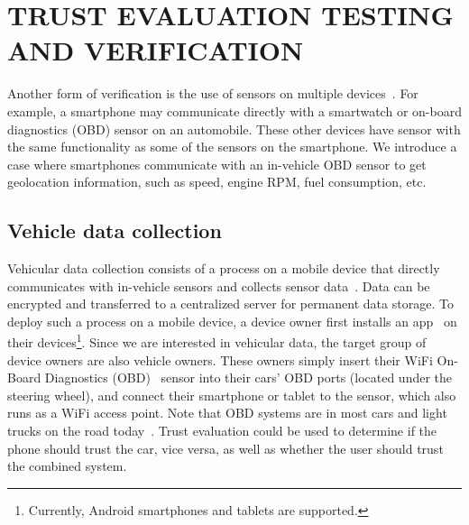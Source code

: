 \section{TRUST EVALUATION TESTING AND VERIFICATION}
\label{sec:geolocation}
Another form of verification is the use of sensors on multiple devices~\cite{ju2012neteye}.  For example,
a smartphone may communicate directly with a smartwatch or on-board diagnostics (OBD)
sensor on an automobile.  These other devices have sensor with the same
functionality as some of the sensors on the smartphone.
We introduce a case where smartphones communicate with an in-vehicle OBD sensor
to get geolocation information, such as speed, engine RPM, fuel consumption, 
etc.

\subsection{Vehicle data collection}

Vehicular data collection consists of a process on a mobile 
device that directly communicates with in-vehicle sensors and collects sensor 
data~\cite{sensor}. Data can be encrypted and transferred to a
centralized server for permanent data storage. 
To deploy such a process on a mobile device, a device owner first installs an
app~\cite{sensor-app} on their devices\footnote{Currently, Android smartphones 
and tablets are supported.}. Since we are interested in
vehicular data, the target group of device owners are also vehicle 
owners. These owners simply insert their WiFi On-Board Diagnostics 
(OBD)~\cite{obd} sensor into their cars' OBD ports (located under the steering wheel),  
and connect their 
smartphone or tablet to the sensor, which also runs as a WiFi access 
point. Note that OBD systems are in most cars and light trucks 
on the road today~\cite{obdconnector}. 
Trust evaluation could be used to determine if the phone should trust the car,
vice versa, as well as whether the user should trust the combined system.

